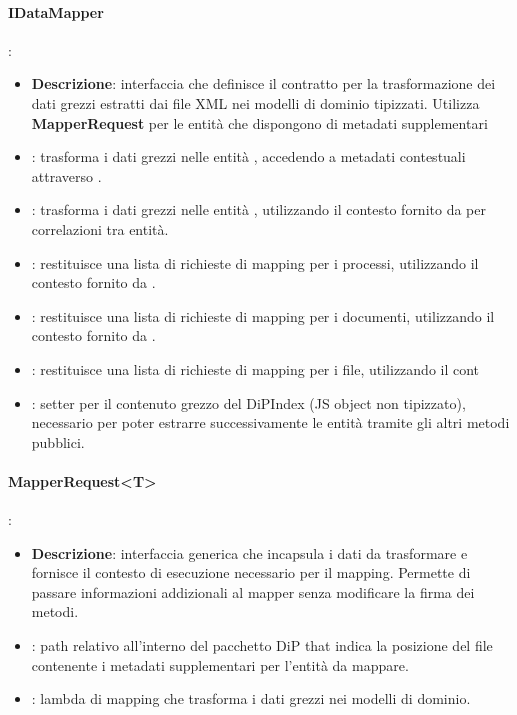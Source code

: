 \paragraph{IDataMapper}:
\begin{itemize}
    \item \textbf{Descrizione}: interfaccia che definisce il contratto per la trasformazione dei dati grezzi estratti dai file XML nei modelli di dominio tipizzati. Utilizza \textbf{MapperRequest} per le entità che dispongono di metadati supplementari
    \item {}: trasforma i dati grezzi nelle entità , accedendo a metadati contestuali attraverso .
    \item {}: trasforma i dati grezzi nelle entità , utilizzando il contesto fornito da  per correlazioni tra entità.
    \item {}: restituisce una lista di richieste di mapping per i processi, utilizzando il contesto fornito da .
    \item {}: restituisce una lista di richieste di mapping per i documenti, utilizzando il contesto fornito da .
    \item {}: restituisce una lista di richieste di mapping per i file, utilizzando il cont
    \item {}: setter per il contenuto grezzo del DiPIndex (JS object non tipizzato), necessario per poter estrarre successivamente le entità tramite gli altri metodi pubblici.
\end{itemize}

\paragraph{MapperRequest<T>}:
\begin{itemize}
    \item \textbf{Descrizione}: interfaccia generica che incapsula i dati da trasformare e fornisce il contesto di esecuzione necessario per il mapping. Permette di passare informazioni addizionali al mapper senza modificare la firma dei metodi.
    \item {}: path relativo all'interno del pacchetto DiP that indica la posizione del file contenente i metadati supplementari per l'entità da mappare.
    \item {}: lambda di mapping che trasforma i dati grezzi nei modelli di dominio.
\end{itemize}

